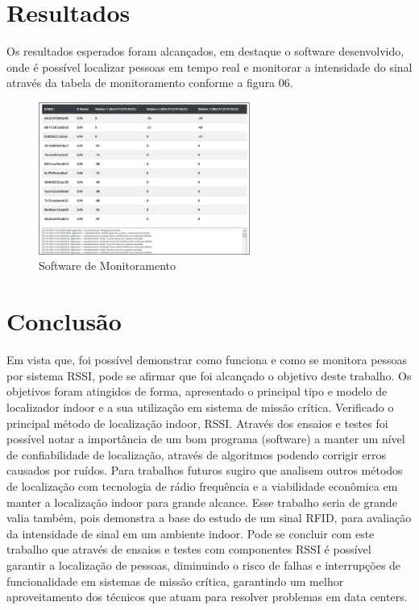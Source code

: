 \documentclass[
	article,			%
	12pt,				%
	oneside,			%
	a4paper,			%
	english,			%
	brazil,				%
	sumario=tradicional
	]{abntex2}
\begin{document}
\section{Resultados}
Os resultados esperados foram alcançados, em destaque o software desenvolvido, onde é possível localizar pessoas em tempo real e monitorar a intensidade do sinal através da tabela de monitoramento conforme a figura 06.
\begin{figure}[H]
	\begin{center}
		\caption{Software de Monitoramento}
		\includegraphics[height=5cm]{image6}
	\end{center}
\end{figure}

\section{Conclusão}
Em vista que, foi possível demonstrar como funciona e como se monitora pessoas por sistema RSSI, pode se afirmar que foi alcançado o objetivo deste trabalho.
Os objetivos foram atingidos de forma, apresentado o principal tipo e modelo de localizador indoor e a sua utilização em sistema de missão crítica. Verificado o principal método de localização indoor, RSSI. Através dos ensaios e testes foi possível notar a importância de um bom programa (software) a manter um nível de confiabilidade de localização, através de algoritmos podendo corrigir erros causados por ruídos.
Para trabalhos futuros sugiro que analisem outros métodos de localização com tecnologia de rádio frequência e a viabilidade econômica em manter a localização indoor para grande alcance. Esse trabalho seria de grande valia também, pois demonstra a base do estudo de um sinal RFID, para avaliação da intensidade de sinal em um ambiente indoor.
Pode se concluir com este trabalho que através de ensaios e testes com componentes RSSI é possível garantir a localização de pessoas, diminuindo o risco de falhas e interrupções de funcionalidade em sistemas de missão crítica, garantindo um melhor aproveitamento dos técnicos que atuam para resolver problemas em data centers.
\end{document}
